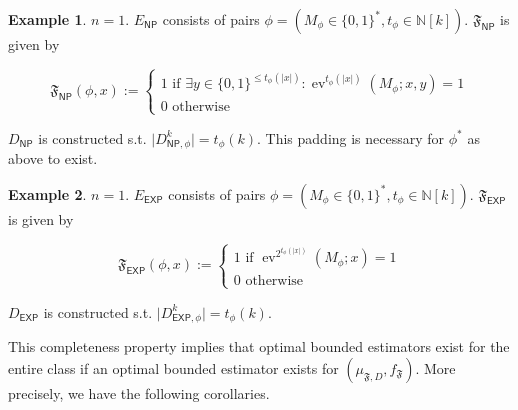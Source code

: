 \documentclass{article}
\numberwithin{equation}{section}
\theoremstyle{definition}
\newtheorem{example}{Example}[section]
\theoremstyle{plain}
\newcommand{\Bool}{\{0,1\}}
\newcommand{\Words}{{\Bool^*}}
\DeclareMathOperator{\Ev}{ev}
\newcommand{\Nats}{\mathbb{N}}
\newcommand{\Abs}[1]{\lvert #1 \rvert}
\begin{document}
\begin{samepage}
\begin{example}

${n = 1}$. ${E_{\mathsf{NP}}}$ consists of pairs ${\phi=(M_\phi \in \Words, t_\phi \in \Nats[k])}$. ${\mathfrak{F}_{\mathsf{NP}}}$ is given by 

\begin{equation}
\mathfrak{F}_{\mathsf{NP}}(\phi,x):=\begin{cases}1 \text{ if } \exists y\in \Bool^{\leq t_\phi(\Abs{x})}: \Ev^{ t_\phi(\Abs{x})}(M_\phi;x,y)=1 \\ 0 \text { otherwise} \end{cases}
\end{equation}

${D_{\mathsf{NP}}}$ is constructed s.t. ${\Abs{D_{\mathsf{NP},\phi}^k}=t_\phi(k)}$. This padding is necessary for ${\phi^*}$ as above to exist. 

\end{example}
\end{samepage}

\begin{samepage}
\begin{example}

${n = 1}$. ${E_{\mathsf{EXP}}}$ consists of pairs ${\phi=(M_\phi \in \Words, t_\phi \in \Nats[k])}$. ${\mathfrak{F}_{\mathsf{EXP}}}$ is given by 

\begin{equation}
\mathfrak{F}_{\mathsf{EXP}}(\phi,x):=\begin{cases}1 \text{ if } \Ev^{2^{t_\phi(\Abs{x})}}(M_\phi;x)=1 \\ 0 \text { otherwise} \end{cases}
\end{equation}

${D_{\mathsf{EXP}}}$ is constructed s.t. ${\Abs{D_{\mathsf{EXP},\phi}^k}=t_\phi(k)}$.

\end{example}
\end{samepage}

This completeness property implies that optimal bounded estimators exist for the entire class if an optimal bounded estimator exists for ${(\mu_{\mathfrak{F},D},f_{\mathfrak{F}})}$. More precisely, we have the following corollaries.
\end{document}
